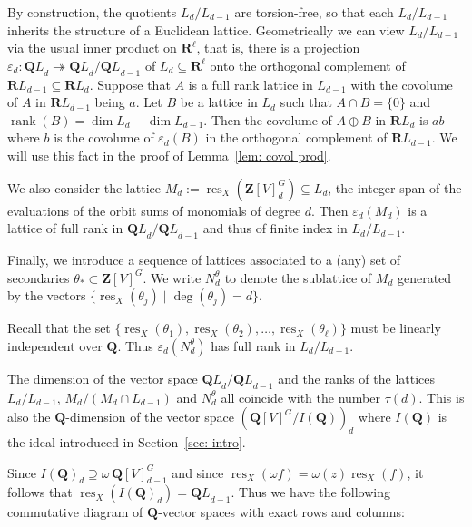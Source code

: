 \documentclass[12pt]{amsart}
\DeclareMathOperator{\res}{res}
\DeclareMathOperator{\rank}{rank}
\newcommand{\QQ}{\mathbf{Q}} %
\newcommand{\RR}{\mathbf{R}} %
\newcommand{\ZZ}{\mathbf{Z}} %
\newcommand{\QQ}{\mathbb{Q}} %
\newcommand{\RR}{\mathbb{R}} %
\newcommand{\ZZ}{\mathbb{Z}} %
\theoremstyle{definition}
\newcommand{\bth}{{{\theta_*}}} %
\newcommand{\QL}{{\QQ L}}
\newcommand{\RL}{{\RR L}}
\begin{document}
By construction, the quotients $L_d/L_{d-1}$ are torsion-free, so that each $L_d/L_{d-1}$ inherits the structure of a Euclidean lattice.  Geometrically we can view $L_d/L_{d-1}$ via the usual inner product on $\RR^\ell$, that is, there is a projection 
$\varepsilon_d: \QL_d \twoheadrightarrow \QL_{d}/\QL_{d-1}$
of $L_d \subseteq \RR^\ell$ onto the orthogonal complement of 
$\RL_{d-1}\subseteq \RR L_d$.  
Suppose that $A$ is a full rank lattice in $L_{d-1}$ with the covolume of $A$ in $\RL_{d-1}$ 
being $a$.  Let $B$ be a lattice in $L_d$ such that $A \cap B = \{0\}$ and 
$\rank(B) = \dim L_d - \dim L_{d-1}$.  Then the covolume of $A\oplus B$ in $\RL_d$ is 
$ab$ where $b$ is the covolume of $\varepsilon_d(B)$ in the orthogonal complement of $\RL_{d-1}$.
We will use this fact in the proof of Lemma~\ref{lem: covol prod}.




We also consider the lattice 
$M_d := \res_X(\ZZ[V]_d^G) \subseteq L_d$, the integer span of the evaluations of the orbit sums of monomials of degree $d$.  
Then $\varepsilon_d(M_d)$ is a lattice of full rank in $\QL_d/\QL_{d-1}$ and thus of finite index in $L_d/L_{d-1}$.

Finally, we introduce a sequence of lattices associated to a (any) set of secondaries 
$\bth \subset \ZZ[V]^G$.  We write $N_d^\theta$ to denote the sublattice of $M_d$
generated by the vectors $\{\res_X(\theta_j) \mid \deg(\theta_j) = d\}$.

Recall that the set $\{\res_X(\theta_1), \res_X(\theta_2),\dots,\res_X(\theta_\ell)\}$
must be linearly independent over $\QQ$.
Thus $\varepsilon_d(N^\theta_d)$ has full rank in $L_d/L_{d-1}$.

The dimension of the vector space
$\QL_d/\QL_{d-1}$ and the ranks of the lattices $L_d/L_{d-1}$, $M_d/(M_d \cap L_{d-1})$ and $N^\theta_d$
all coincide with the number $\tau(d)$. 
This is also the $\QQ$-dimension of the vector space $(\QQ[V]^G/I(\QQ))_d$
where $I(\QQ)$ is the ideal introduced in Section~\ref{sec: intro}. 


Since $I(\QQ)_d \supseteq \omega\, \QQ[V]_{d-1}^G$ and since $\res_X(\omega f) = \omega(z)\res_X(f)$, 
it follows that 
$\res_X(I(\QQ)_d) = \QL_{d-1}$.
Thus we have the following commutative diagram of $\QQ$-vector spaces with exact rows and columns:

\end{document}

